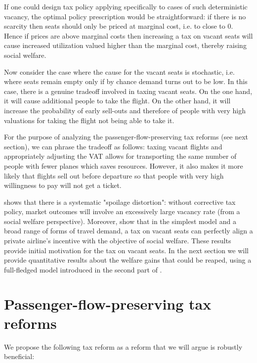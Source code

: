 \documentclass{article}
\begin{document}
If one could design tax policy applying specifically to cases of such deterministic vacancy, the optimal policy prescription would be straightforward: if there is no scarcity then seats should only be priced at marginal cost, i.e. to close to 0. Hence if prices are above marginal costs then increasing a tax on vacant seats will cause increased utilization valued higher than the marginal cost, thereby raising social welfare.

Now consider the case where the cause for the vacant seats is stochastic, i.e. where seats remain empty only if by chance demand turns out to be low. In this case, there is a genuine tradeoff involved in taxing vacant seats. On the one hand, it will cause additional people to take the flight. On the other hand, it will increase the probability of early sell-outs and therefore of people with very high valuations for taking the flight not being able to take it.

For the purpose of analyzing the passenger-flow-preserving tax reforms (see next section), we can phrase the tradeoff as follows: taxing vacant flights and appropriately adjusting the VAT allows for transporting the same number of people with fewer planes which saves resources. However, it also makes it more likely that flights sell out before departure so that people with very high willingness to pay will not get a ticket.

 \citet{Dörpinghaus_et_al_2026} shows that there is a systematic "spoilage distortion": without corrective tax policy, market outcomes will involve an excessively large vacancy rate (from a social welfare perspective). Moreover,  \citet{Dörpinghaus_et_al_2026} show that in the simplest model and a broad range of forms of travel demand, a tax on vacant seats can perfectly align a private airline's incentive with the objective of social welfare. These results provide initial motivation for the tax on vacant seats. In the next section we will provide quantitative results about the welfare gains that could be reaped, using a full-fledged model introduced in the second part of \citet{Dörpinghaus_et_al_2026} .

\section{Passenger-flow-preserving tax reforms }

We propose the following tax reform as a reform that we will argue is robustly beneficial:
\end{document}
